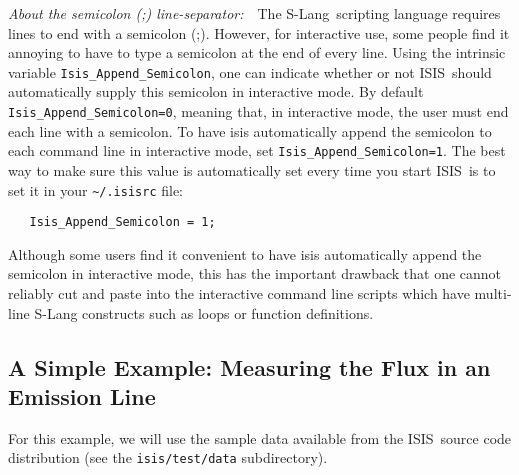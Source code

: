 \documentclass{book}
\newcommand{\isisx}{{\sc ISIS~}}
\newcommand{\isis}{{\sc ISIS}}
\newcommand{\slang}{{\sc S-Lang}}
\begin{document}
{\it About the semicolon (;) line-separator:}~~The \slang{}ripting language requires lines to end with a semicolon (;).
However, for interactive use, some people find it annoying to
have to type a semicolon at the end of every line. Using the
intrinsic variable \verb|Isis_Append_Semicolon|, one can
indicate whether or not \isis\ should automatically supply this
semicolon in interactive mode. By default
\verb|Isis_Append_Semicolon=0|, meaning that, in interactive
mode, the user must end each line with a semicolon.  To have
isis automatically append the semicolon to each command line in
interactive mode, set \verb|Isis_Append_Semicolon=1|. The best
way to make sure this value is automatically set every time you
start \isis\ is to set it in your \verb|~/.isisrc| file:
\begin{verbatim}
   Isis_Append_Semicolon = 1;
\end{verbatim}
Although some users find it convenient to have isis
automatically append the semicolon in interactive mode, this
has the important drawback that one cannot reliably cut and
paste into the interactive command line scripts which have
multi-line S-Lang constructs such as loops or function
definitions.

\subsection{A Simple Example: Measuring the Flux in an Emission Line}
\label{subsec:simpleexample}

For this example, we will use the sample data available from the
\isisx source code distribution (see the \verb|isis/test/data|
subdirectory).
\end{document}

